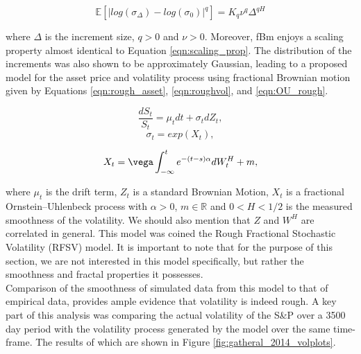 \documentclass[12pt,oneside]{article}
\begin{document}
\begin{equation}
\label{eqn:scaling_prop}
\mathbb{E}[|log(\sigma_\Delta)-log(\sigma_0)|^q]=K_q\nu^q\Delta^{qH}
\end{equation}

where $\Delta$ is the increment size, $q>0$ and $\nu>0$. Moreover, fBm enjoys a scaling property almost identical to Equation \ref{eqn:scaling_prop}. The distribution of the increments was also shown to be  approximately Gaussian, leading  to a proposed model for the asset price and volatility process using fractional Brownian motion given by Equations \ref{eqn:rough_asset}, \ref{eqn:roughvol}, and \ref{eqn:OU_rough}.

\begin{equation}
\label{eqn:rough_asset}
 \frac{dS_{t}}{S_{t}} = \mu_{t} dt + \sigma_{t} dZ_{t},
\end{equation}
\begin{equation}
\label{eqn:roughvol}
    \sigma_{t} = exp(X_{t}),
\end{equation}

\begin{equation}
\label{eqn:OU_rough}
X_{t}=\vega\int_{-\infty}^{t} e^{-(t-s)\alpha}dW_{t}^{H}+m,
\end{equation}

where $\mu_{t}$ is the drift term, $Z_{t}$ is a standard Brownian Motion, $X_{t}$ is a fractional Ornstein–Uhlenbeck process with $\alpha>0$, $m\in\mathbb{R}$ and $0<H<1/2$ is the measured smoothness of the volatility. We should also mention that $Z$ and $W^{H}$ are correlated in general. This model was coined the Rough Fractional Stochastic Volatility (RFSV) model. It is important to note that for the purpose of this section, we are not interested in this model specifically, but rather the smoothness and fractal properties it possesses.
\\

Comparison of the smoothness of simulated data from this model to that of empirical data, provides ample evidence that volatility is indeed rough. A key part of this analysis was comparing the actual volatility of the S\&P over a 3500 day period with the volatility process generated by the model over the same time-frame. The results of which are shown in Figure \ref{fig:gatheral_2014_volplots}.
\\
\end{document}
